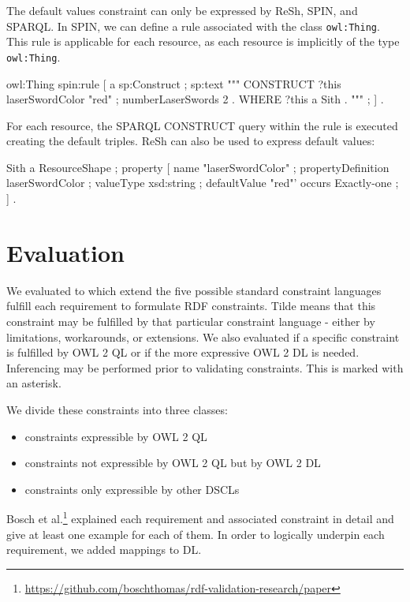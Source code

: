 \documentclass{llncs}
\newcommand{\ms}[1]{\texttt{#1}}
\begin{document}
The default values constraint can only be expressed by ReSh, SPIN, and SPARQL.
In SPIN, we can define a rule associated with the class \ms{owl:Thing}.
This rule is applicable for each resource, as each resource is implicitly of the type \ms{owl:Thing}. 

\begin{ex}
owl:Thing spin:rule [ a sp:Construct ; sp:text """
    CONSTRUCT {
        ?this laserSwordColor "red" ;
              numberLaserSwords 2 . }
    WHERE {             
        ?this a Sith . } """ ; ] .
\end{ex}

For each resource, the SPARQL CONSTRUCT query within the rule is executed creating the default triples.
ReSh can also be used to express default values:

\begin{ex}
Sith a ResourceShape ;
    property [
        name "laserSwordColor" ;
        propertyDefinition laserSwordColor ;
        valueType xsd:string ;
        defaultValue "red"'
        occurs Exactly-one ; ] .
\end{ex}

\section{Evaluation}

We evaluated to which extend the five possible standard constraint languages fulfill each requirement to formulate RDF constraints.
Tilde means that this constraint may be fulfilled by that particular constraint language - either by limitations, workarounds, or extensions.
We also evaluated if a specific constraint is fulfilled by OWL 2 QL or if the more expressive OWL 2 DL is needed. 
Inferencing may be performed prior to validating constraints. This is marked with an asterisk. 

We divide these constraints into three classes:
\begin{itemize}
	\item constraints expressible by OWL 2 QL
	\item constraints not expressible by OWL 2 QL but by OWL 2 DL
	\item constraints only expressible by other DSCLs
\end{itemize}

Bosch et al.\footnote{\url{https://github.com/boschthomas/rdf-validation-research/paper}} explained each requirement and associated constraint in detail and give at least one example for each of them\cite{BoschNolleAcarEckert2015}.
In order to logically underpin each requirement, we added mappings to DL.  
\end{document}
